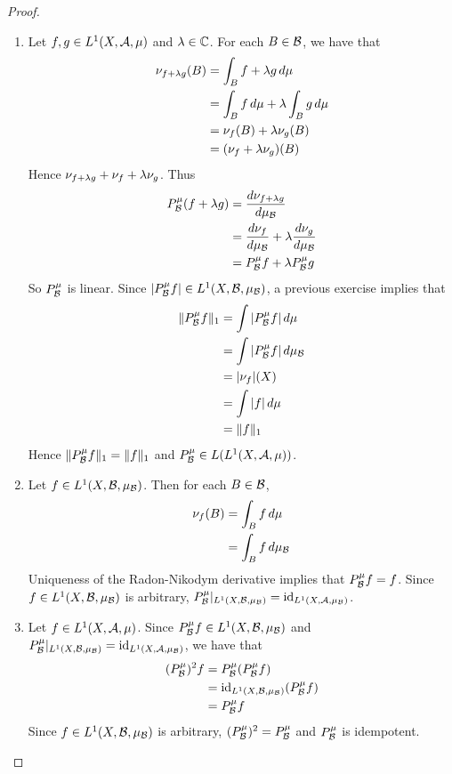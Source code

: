 \documentclass{book}
\begin{document}
	\begin{proof}\
		\begin{enumerate}
			\item Let $f, g \in L^1(X, \mathcal{A}, \mu)$ and $\lambda \in \mathbb{C}$. For each $B \in \mathcal{B}$, we have that 
			\begin{align*}
				\nu_{f + \lambda g} (B) 
				& = \int_{B} f + \lambda g \, d \mu \\
				& = \int_{B} f  \, d \mu + \lambda \int_{B} g \, d \mu \\
				& = \nu_{f}(B) + \lambda \nu_{g}(B) \\
				& = (\nu_{f} + \lambda \nu_{g})(B)
			\end{align*}
			Hence $\nu_{f + \lambda g} + \nu_{f} + \lambda \nu_{g}$. Thus 
			\begin{align*}
				P^{\mu}_{\mathcal{B}}(f + \lambda g)
				& = \frac{d \nu_{f + \lambda g}}{d \mu_{\mathcal{B}}} \\
				& = \frac{d \nu_f }{d \mu_{\mathcal{B}}} + \lambda \frac{d \nu_{g}}{d \mu_{\mathcal{B}}} \\
				& = P^{\mu}_{\mathcal{B}} f + \lambda P^{\mu}_{\mathcal{B}} g
			\end{align*}
			So $P^{\mu}_{\mathcal{B}}$ is linear. Since $|P^{\mu}_{\mathcal{B}}f| \in L^1(X, \mathcal{B}, \mu_{\mathcal{B}})$, a previous exercise implies that
			\begin{align*}
				\|P^{\mu}_{\mathcal{B}}f\|_1
				& = \int |P^{\mu}_{\mathcal{B}}f| \, d \mu \\
				& = \int |P^{\mu}_{\mathcal{B}}f| \, d \mu_{\mathcal{B}} \\
				& = |\nu_{f}|(X) \\
				& = \int |f| \, d \mu \\
				& = \|f\|_1
			\end{align*}
			Hence $\|P^{\mu}_{\mathcal{B}} f \|_1 = \|f\|_1$ and $P^{\mu}_{\mathcal{B}} \in L(L^1(X, \mathcal{A}, \mu))$.
			\item Let $f \in L^1(X, \mathcal{B}, \mu_{\mathcal{B}})$. Then for each $B \in \mathcal{B}$, 
			\begin{align*}
				\nu_f(B)
				& = \int_B f \, d \mu \\
				& = \int_B f \, d \mu_{\mathcal{B}} 
			\end{align*}
			Uniqueness of the Radon-Nikodym derivative implies that $P^{\mu}_{\mathcal{B}}f = f$. Since $f \in L^1(X, \mathcal{B}, \mu_{\mathcal{B}})$ is arbitrary, $P^{\mu}_{\mathcal{B}}|_{L^1(X, \mathcal{B}, \mu_{\mathcal{B}})} = \operatorname{id}_{L^1(X, \mathcal{A}, \mu_{\mathcal{B}})}$.
			\item Let $f \in L^1(X, \mathcal{A}, \mu)$. Since $P^{\mu}_{\mathcal{B}}f \in L^1(X, \mathcal{B}, \mu_{\mathcal{B}})$ and $P^{\mu}_{\mathcal{B}}|_{L^1(X, \mathcal{B}, \mu_{\mathcal{B}})} = \operatorname{id}_{L^1(X, \mathcal{A}, \mu_{\mathcal{B}})}$, we have that
			\begin{align*}
				(P^{\mu}_{\mathcal{B}})^2 f 
				& = P^{\mu}_{\mathcal{B}}(P^{\mu}_{\mathcal{B}} f) \\
				& = \operatorname{id}_{L^1(X, \mathcal{B}, \mu_{\mathcal{B}})} (P^{\mu}_{\mathcal{B}} f) \\
				& = P^{\mu}_{\mathcal{B}}f
			\end{align*}
			Since $f \in L^1(X, \mathcal{B}, \mu_{\mathcal{B}})$ is arbitrary, $(P^{\mu}_{\mathcal{B}})^2 = P^{\mu}_{\mathcal{B}}$ and $P^{\mu}_{\mathcal{B}}$ is idempotent. 
		\end{enumerate}
	\end{proof}
\end{document}
